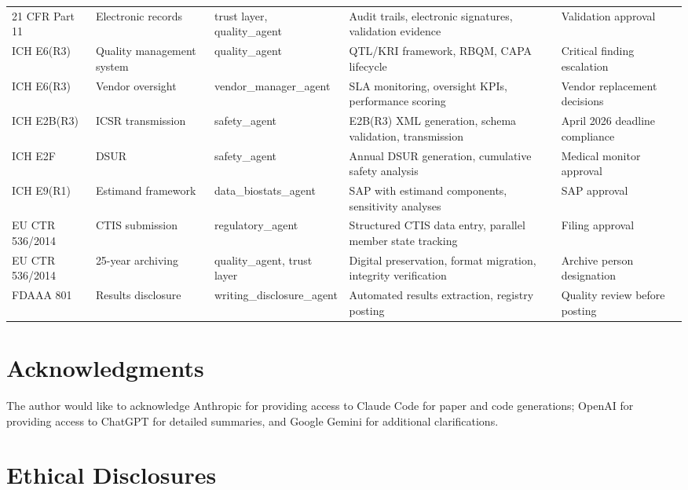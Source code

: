 \begin{longtable}{L{2.5cm} L{2.5cm} L{2.2cm} L{2.2cm} L{2.2cm}}
21 CFR Part 11 & Electronic records & trust layer, quality\_agent & Audit trails, electronic signatures, validation evidence & Validation approval \\
ICH E6(R3) & Quality management system & quality\_agent & QTL/KRI framework, RBQM, CAPA lifecycle & Critical finding escalation \\
ICH E6(R3) & Vendor oversight & vendor\_manager\_agent & SLA monitoring, oversight KPIs, performance scoring & Vendor replacement decisions \\
ICH E2B(R3) & ICSR transmission & safety\_agent & E2B(R3) XML generation, schema validation, transmission & April 2026 deadline compliance \\
ICH E2F & DSUR & safety\_agent & Annual DSUR generation, cumulative safety analysis & Medical monitor approval \\
ICH E9(R1) & Estimand framework & data\_biostats\_agent & SAP with estimand components, sensitivity analyses & SAP approval \\
EU CTR 536/2014 & CTIS submission & regulatory\_agent & Structured CTIS data entry, parallel member state tracking & Filing approval \\
EU CTR 536/2014 & 25-year archiving & quality\_agent, trust layer & Digital preservation, format migration, integrity verification & Archive person designation \\
FDAAA 801 & Results disclosure & writing\_disclosure\_agent & Automated results extraction, registry posting & Quality review before posting \\
\end{longtable}

\section*{Acknowledgments}

The author would like to acknowledge Anthropic for providing access to Claude Code for
paper and code generations; OpenAI for providing access to ChatGPT for detailed summaries,
and Google Gemini for additional clarifications.

\section*{Ethical Disclosures}

